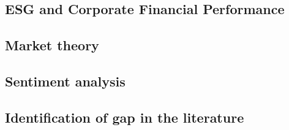 

\subsection{ESG and Corporate Financial Performance}


\subsection{Market theory}


\subsection{Sentiment analysis}

\subsection{Identification of gap in the literature}

